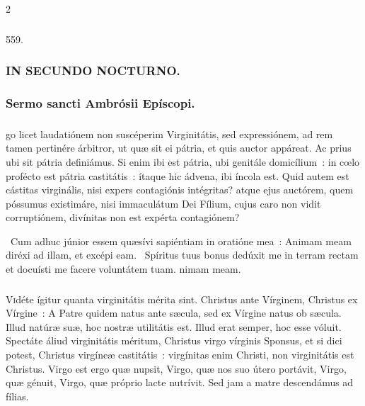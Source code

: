 \documentclass[9pt,twoside]{extarticle}
\begin{document}
\begin{multicols}{2}
\subsubsection*{\center {}}

\begin{tightlist}{}
\item {} 559. 
\item {}
\end{tightlist}

\subsubsection*{\center \textsc{IN SECUNDO NOCTURNO.}}
\subsubsection*{\center Sermo sancti Ambrósii Epíscopi.}
\subsubsection*{\center {}}
go licet laudatiónem non suscéperim Virginitátis, sed expressiónem, ad rem tamen pertinére árbitror, ut quæ sit ei pátria, et quis auctor appáreat. Ac prius ubi sit pátria definiámus. Si enim ibi est pátria, ubi genitále domicílium~: in cœlo profécto est pátria castitátis~: ítaque hic ádvena, ibi íncola est. Quid autem est cástitas virginális, nisi expers contagiónis intégritas? atque ejus auctórem, quem póssumus existimáre, nisi immaculátum Dei Fílium, cujus caro non vidit corruptiónem, divínitas non est expérta contagiónem?

\begin{tightlist}{}
\item {}~Cum adhuc júnior essem quæsívi sapiéntiam in oratióne mea~: \textred{*} Animam meam diréxi ad illam, et excépi eam. ~Spíritus tuus bonus dedúxit me in terram rectam et docuísti me facere voluntátem tuam. nimam meam.
\end{tightlist}

\subsubsection*{\center {}}
\lettrine{V}idéte ígitur quanta virginitátis mérita sint. Christus ante Vírginem, Christus ex Vírgine~: A Patre quidem natus ante sæcula, sed ex Vírgine natus ob sæcula. Illud natúræ suæ, hoc nostræ utilitátis est. Illud erat semper, hoc esse vóluit. Spectáte áliud virginitátis méritum, Christus virgo vírginis Sponsus, et si dici potest, Christus virgíneæ castitátis~: virgínitas enim Christi, non virginitátis est Christus. Virgo est ergo quæ nupsit, Virgo, quæ nos suo útero portávit, Virgo, quæ génuit, Virgo, quæ próprio lacte nutrívit. Sed jam a matre descendámus ad fílias.


\end{multicols}
\end{document}
